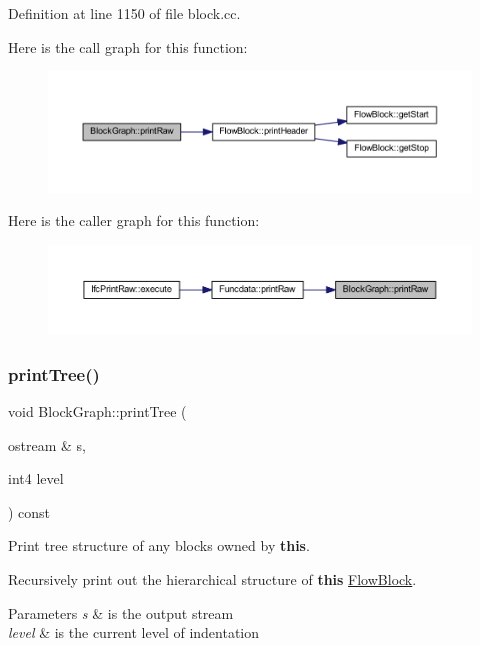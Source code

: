 Definition at line 1150 of file block.\+cc.

Here is the call graph for this function\+:
\nopagebreak
\begin{figure}[H]
\begin{center}
\leavevmode
\includegraphics[width=350pt]{class_block_graph_abcae771fc675bcc52c78b2f1dc0ab98a_cgraph}
\end{center}
\end{figure}
Here is the caller graph for this function\+:
\nopagebreak
\begin{figure}[H]
\begin{center}
\leavevmode
\includegraphics[width=350pt]{class_block_graph_abcae771fc675bcc52c78b2f1dc0ab98a_icgraph}
\end{center}
\end{figure}
\mbox{\label{class_block_graph_add1908219c53b2687c4d1c6c9132c11e}} 
\subsubsection{\texorpdfstring{printTree()}{printTree()}}
{\footnotesize\ttfamily void Block\+Graph\+::print\+Tree (\begin{DoxyParamCaption}\item[{ostream \&}]{s,  }\item[{int4}]{level }\end{DoxyParamCaption}) const\hspace{0.3cm}{\ttfamily [virtual]}}



Print tree structure of any blocks owned by {\bfseries{this}}. 

Recursively print out the hierarchical structure of {\bfseries{this}} \mbox{\hyperlink{class_flow_block}{Flow\+Block}}. 
\begin{DoxyParams}{Parameters}
{\em s} & is the output stream \\
\hline
{\em level} & is the current level of indentation \\
\hline
\end{DoxyParams}


